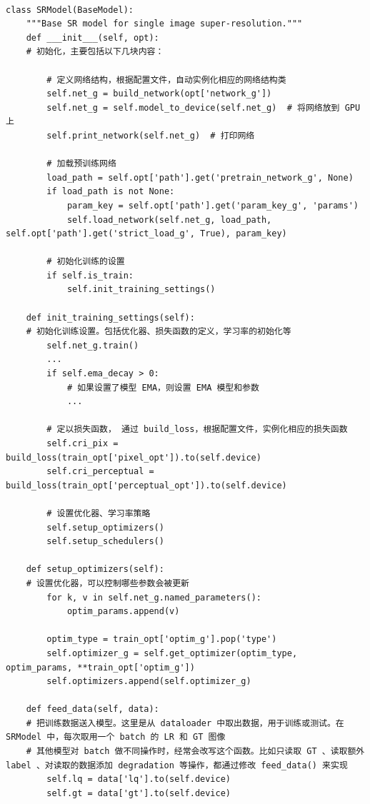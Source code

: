 \documentclass[../main.tex]{subfiles}
\begin{document}
\begin{verbatim}

class SRModel(BaseModel):
    """Base SR model for single image super-resolution."""
    def ___init___(self, opt):
    # 初始化，主要包括以下几块内容：

        # 定义网络结构，根据配置文件，自动实例化相应的网络结构类
        self.net_g = build_network(opt['network_g'])
        self.net_g = self.model_to_device(self.net_g)  # 将网络放到 GPU 上
        self.print_network(self.net_g)  # 打印网络

        # 加载预训练网络
        load_path = self.opt['path'].get('pretrain_network_g', None)
        if load_path is not None:
            param_key = self.opt['path'].get('param_key_g', 'params')
            self.load_network(self.net_g, load_path, self.opt['path'].get('strict_load_g', True), param_key)

        # 初始化训练的设置
        if self.is_train:
            self.init_training_settings()

    def init_training_settings(self):
    # 初始化训练设置。包括优化器、损失函数的定义，学习率的初始化等
        self.net_g.train()
        ...
        if self.ema_decay > 0:
            # 如果设置了模型 EMA，则设置 EMA 模型和参数
            ...

        # 定以损失函数， 通过 build_loss，根据配置文件，实例化相应的损失函数
        self.cri_pix = build_loss(train_opt['pixel_opt']).to(self.device)
        self.cri_perceptual = build_loss(train_opt['perceptual_opt']).to(self.device)

        # 设置优化器、学习率策略
        self.setup_optimizers()
        self.setup_schedulers()

    def setup_optimizers(self):
    # 设置优化器，可以控制哪些参数会被更新
        for k, v in self.net_g.named_parameters():
            optim_params.append(v)

        optim_type = train_opt['optim_g'].pop('type')
        self.optimizer_g = self.get_optimizer(optim_type, optim_params, **train_opt['optim_g'])
        self.optimizers.append(self.optimizer_g)

    def feed_data(self, data):
    # 把训练数据送入模型。这里是从 dataloader 中取出数据，用于训练或测试。在 SRModel 中，每次取用一个 batch 的 LR 和 GT 图像
    # 其他模型对 batch 做不同操作时，经常会改写这个函数。比如只读取 GT 、读取额外 label 、对读取的数据添加 degradation 等操作，都通过修改 feed_data() 来实现
        self.lq = data['lq'].to(self.device)
        self.gt = data['gt'].to(self.device)


\end{verbatim}
\end{document}
